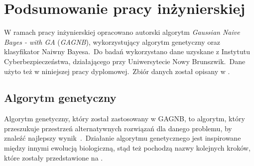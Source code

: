 \chapter{Podsumowanie pracy inżynierskiej}
W ramach pracy inżynierskiej opracowano autorski algorytm \textit{Gaussian Naive Bayes - with GA} (\textit{GAGNB}), wykorzystujący algorytm genetyczny oraz klasyfikator Naiwny Bayesa.\ Do badań wykorzystano dane uzyskane z Instytutu Cyberbezpieczeństwa, działającego przy Uniwersytecie Nowy Brunszwik.\ Dane użyto też w niniejszej pracy dyplomowej.\ Zbiór danych został opisany w .\

\section{Algorytm genetyczny}
Algorytm genetyczny, który został zastosowany w GAGNB, to algorytm, który przeszukuje przestrzeń alternatywnych rozwiązań dla danego problemu, by znaleźć najlepszy
wynik~\cite{Kusiak2021}.\ Działanie algorytmu genetycznego jest inspirowane między innymi ewolucją biologiczną, stąd też pochodzą nazwy kolejnych kroków, które zostały przedstawione na .


